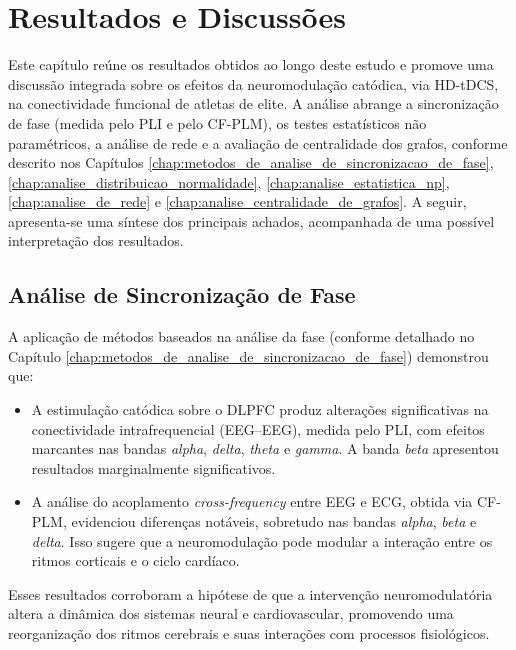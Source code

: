 \chapter{Resultados e Discussões}
\label{chap:resultados_e_discussoes}
Este capítulo reúne os resultados obtidos ao longo deste estudo e promove uma discussão integrada sobre os efeitos da neuromodulação catódica, via HD-tDCS, na conectividade funcional de atletas de elite. A análise abrange a sincronização de fase (medida pelo PLI e pelo CF-PLM), os testes estatísticos não paramétricos, a análise de rede e a avaliação de centralidade dos grafos, conforme descrito nos Capítulos \ref{chap:metodos_de_analise_de_sincronizacao_de_fase}, \ref{chap:analise_distribuicao_normalidade}, \ref{chap:analise_estatistica_np}, \ref{chap:analise_de_rede} e \ref{chap:analise_centralidade_de_grafos}. A seguir, apresenta-se uma síntese dos principais achados, acompanhada de uma possível interpretação dos resultados.

\section{Análise de Sincronização de Fase}
A aplicação de métodos baseados na análise da fase (conforme detalhado no Capítulo \ref{chap:metodos_de_analise_de_sincronizacao_de_fase}) demonstrou que:
\begin{itemize}
    \item A estimulação catódica sobre o DLPFC produz alterações significativas na conectividade intrafrequencial (EEG--EEG), medida pelo PLI, com efeitos marcantes nas bandas \emph{alpha}, \emph{delta}, \emph{theta} e \emph{gamma}. A banda \emph{beta} apresentou resultados marginalmente significativos.
    \item A análise do acoplamento \emph{cross-frequency} entre EEG e ECG, obtida via CF-PLM, evidenciou diferenças notáveis, sobretudo nas bandas \emph{alpha}, \emph{beta} e \emph{delta}. Isso sugere que a neuromodulação pode modular a interação entre os ritmos corticais e o ciclo cardíaco.
\end{itemize}
Esses resultados corroboram a hipótese de que a intervenção neuromodulatória altera a dinâmica dos sistemas neural e cardiovascular, promovendo uma reorganização dos ritmos cerebrais e suas interações com processos fisiológicos.

